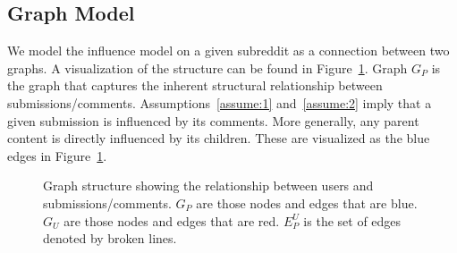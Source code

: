 \documentclass[letterpaper, 10 pt, conference]{ieeeconf}
\theoremstyle{plain}
\begin{document}
\subsection{Graph Model}
We model the influence model on a given subreddit as a connection between two graphs. A visualization of the structure can be found in Figure~\ref{fig:model:hypergraph}. Graph \(G_P\) is the graph that captures the inherent structural relationship between submissions/comments. Assumptions~\ref{assume:1} and~\ref{assume:2} imply that a given submission is influenced by its comments. More generally, any parent content is directly influenced by its children. These are visualized as the blue edges in Figure~\ref{fig:model:hypergraph}.

\begin{figure}
  \centering
  \caption{Graph structure showing the relationship between users and submissions/comments. \(G_P\) are those nodes and edges that are blue. \(G_U\) are those nodes and edges that are red. \(E_P^U\) is the set of edges denoted by broken lines.}
  \label{fig:model:hypergraph}
\end{figure}
\end{document}

